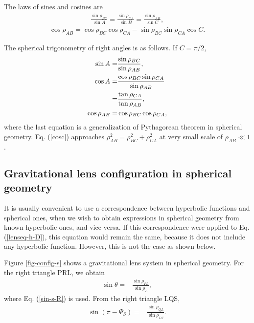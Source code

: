 \documentclass[twocolumn,showpacs,preprintnumbers,amsmath,amssymb]{revtex4-1}
\begin{document}
The laws of sines and cosines are 
\begin{align}
\frac{\sin\rho_{BC}}{\sin A} 
= 
\frac{\sin\rho_{CA}}{\sin B} 
=
\frac{\sin\rho_{AB}}{\sin C} , 
\label{sine-s}
\end{align}
\begin{align}
\cos\rho_{AB} = \cos\rho_{BC} \cos\rho_{CA} - \sin\rho_{BC} \sin\rho_{CA} \cos C .
\label{cos-s}
\end{align}



The spherical trigonometry of right angles is as follows. 
If $C = \pi/2$, 
\begin{align}
\sin A =& 
\frac{\sin\rho_{BC}}{\sin\rho_{AB}} , 
\label{sin-s-R}
\\
\cos A =&
\frac{\cos\rho_{BC}\sin\rho_{CA}}{\sin\rho_{AB}}
\notag\\
=&
\frac{\tan\rho_{CA}}{\tan\rho_{AB}} , 
\label{cos-s-R}
\\
\cos\rho_{AB} =&
 \cos\rho_{BC} \cos\rho_{CA} , 
 \label{cosc}
\end{align}
where 
the last equation is a generalization of Pythagorean theorem in spherical geometry. 
Eq. (\ref{cosc}) approaches $\rho_{AB}^2 = \rho_{BC}^2 + \rho_{CA}^2$ 
at very small scale of $\rho_{AB} \ll 1$. 





\subsection{Gravitational lens configuration in spherical geometry}
It is usually convenient to use a correspondence between 
hyperbolic functions and spherical ones, 
when we wish to obtain expressions in spherical geometry 
from known hyperbolic ones, and vice versa. 
If this correspondence were applied to Eq. (\ref{lenseq-h-D}), 
this equation would remain the same, 
because it does not include any hyperbolic function. 
However, this is not the case as shown below. 

Figure \ref{fig-config-s} shows 
a gravitational lens system in spherical geometry. 
For the right triangle PRL, we obtain 
\begin{align}
\sin\theta 
=&
\frac{\sin \rho_{PL}}{\sin \rho_L} ,
\label{PRL-s}
\end{align}
where Eq. (\ref{sin-s-R}) is used. 
From the right triangle LQS, 
\begin{align}
\sin(\pi - \Psi_S)  
=&
\frac{\sin \rho_{QL}}{\sin \rho_{LS}} .
\label{LQS-s}
\end{align}
\end{document}

